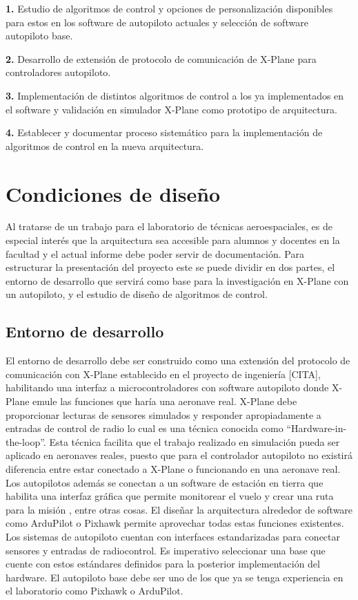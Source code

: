 \textbf{1.} Estudio de algoritmos de control y opciones de personalización disponibles para estos en los software de autopiloto actuales y selección de software autopiloto base.

\textbf{2.} Desarrollo de extensión de protocolo de comunicación de X-Plane para controladores autopiloto.

\textbf{3.} Implementación de distintos algoritmos de control a los ya implementados en el software y validación en simulador X-Plane como prototipo de arquitectura.

\textbf{4.} Establecer y documentar proceso sistemático para la implementación de algoritmos de control en la nueva arquitectura.

\section{Condiciones de diseño}

Al tratarse de un trabajo para el laboratorio de técnicas aeroespaciales, es de especial interés que la arquitectura sea accesible para alumnos y docentes en la facultad y el actual informe debe poder servir de documentación. Para estructurar la presentación del proyecto este se puede dividir en dos partes, el entorno de desarrollo que servirá como base para la investigación en X-Plane con un autopiloto, y el estudio de diseño de algoritmos de control.

\subsection{Entorno de desarrollo}

El entorno de desarrollo debe ser construido como una extensión del protocolo de comunicación con X-Plane establecido en el proyecto de ingeniería [CITA], habilitando una interfaz a microcontroladores con software autopiloto donde X-Plane emule las funciones que haría una aeronave real. X-Plane debe proporcionar lecturas de sensores simulados y responder apropiadamente a entradas de control de radio lo cual es una técnica conocida como ``Hardware-in-the-loop''. Esta técnica facilita que el trabajo realizado en simulación pueda ser aplicado en aeronaves reales, puesto que para el controlador autopiloto no existirá diferencia entre estar conectado a X-Plane o funcionando en una aeronave real. Los autopilotos además se conectan a un software de estación en tierra que habilita una interfaz gráfica que permite monitorear el vuelo y crear una ruta para la misión \cite{ardupilot-gs}, entre otras cosas. El diseñar la arquitectura alrededor de software como ArduPilot o Pixhawk permite aprovechar todas estas funciones existentes. Los sistemas de autopiloto cuentan con interfaces estandarizadas para conectar sensores y entradas de radiocontrol. Es imperativo seleccionar una base que cuente con estos estándares definidos para la posterior implementación del hardware. El autopiloto base debe ser uno de los que ya se tenga experiencia en el laboratorio como Pixhawk o ArduPilot.

